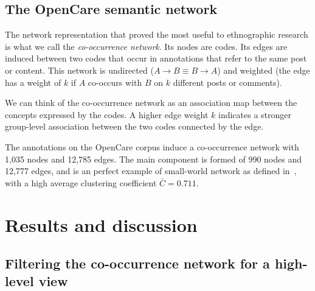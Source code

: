 \documentclass{llncs}
\begin{document}
\subsection{The OpenCare semantic network}

The network representation that proved the most useful to ethnographic research is what we call the \emph{co-occurrence network}. Its nodes are codes. Its edges are induced between two codes that occur in annotations that refer to the same post or content. This network is undirected ($A \rightarrow B \equiv B \rightarrow A$) and weighted (the edge has a weight of $k$ if $A$ co-occurs with $B$ on $k$ different posts or comments).

We can think of the co-occurrence network as an association map between the concepts expressed by the codes. A higher edge weight $k$ indicates a stronger group-level association between the two codes connected by the edge. 

The annotations on the OpenCare corpus induce a co-occurrence network with 1,035 nodes and 12,785 edges. The main component is formed of 990 nodes and 12,777 edges, and is an perfect example of small-world network as defined in~\cite{Watts1998}, with a high average clustering coefficient $\bar{C} = 0.711$.


\section{Results and discussion} \label{sec_results}

\subsection{Filtering the co-occurrence network for a high-level view} \label{ssec_filtering_co_occurrence}
\end{document}
